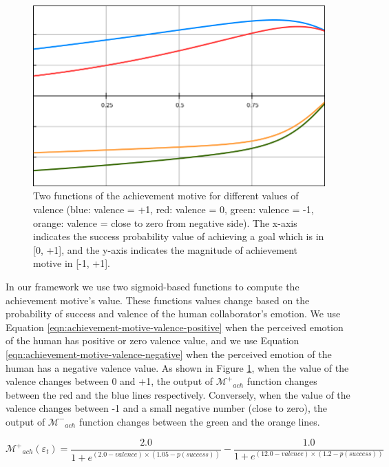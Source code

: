 \documentclass[12pt]{report}
\begin{document}
\begin{figure}[tbh]
  \centering
  \includegraphics[width=1\textwidth]{figure/achievement_motive_functions.png}
  \caption{Two functions of the achievement motive for different values of
  valence (blue: valence = +1, red: valence = 0, green: valence = -1, orange:
  valence = close to zero from negative side). The x-axis indicates the success
  probability value of achieving a goal which is in [0, +1], and the y-axis
  indicates the magnitude of achievement motive in [-1, +1].}
  \label{fig:achievement-motive-functions}
\end{figure}

In our framework we use two sigmoid-based functions to compute the achievement
motive's value. These functions values change based on the probability of
success and valence of the human collaborator's emotion. We use Equation
\ref{eqn:achievement-motive-valence-positive} when the perceived emotion of the
human has positive or zero valence value, and we use Equation
\ref{eqn:achievement-motive-valence-negative} when the perceived emotion
of the human has a negative valence value. As shown in Figure
\ref{fig:achievement-motive-functions}, when the value of the valence changes
between 0 and +1, the output of $\mathcal{M^{+}}_{ach}$ function changes between
the red and the blue lines respectively. Conversely, when the value of the
valence changes between -1 and a small negative number (close to zero), the
output of $\mathcal{M^{-}}_{ach}$ function changes between the green and the
orange lines.

\begin{equation}
\mathcal{M^{+}}_{ach}(\varepsilon_t)=
\frac{2.0}{1+e^{(2.0-valence)\times(1.05-p(success))}}
- \frac{1.0}{1+e^{(12.0-valence)\times(1.2-p(success))}}
\label{eqn:achievement-motive-valence-positive}
\end{equation}
\end{document}
